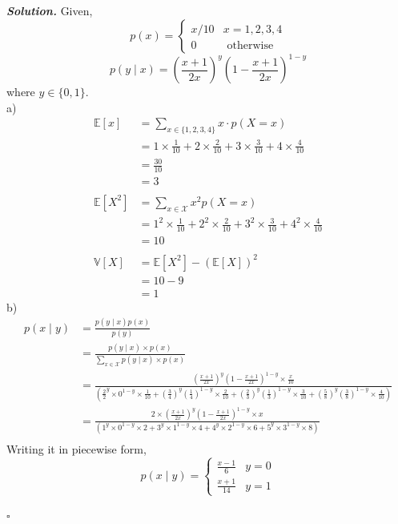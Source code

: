 \documentclass[12pt]{article}
\newenvironment{solution}[1][\it{Solution}]{\textbf{#1. } }{$\square$}
\begin{document}
\begin{solution}
Given,
$$
p(x)=\left\{\begin{array}{ll}
x / 10 & x=1,2,3,4 \\
0 & \text { otherwise }
\end{array}\right.
$$
$$
p(y \mid x)=\left(\frac{x+1}{2 x}\right)^{y}\left(1-\frac{x+1}{2 x}\right)^{1-y}
$$
where $y \in\{0,1\}$.\\
a)
\begin{align*}
\mathbb{E}[x] &=\sum_{x \in\{1,2,3,4\}} x \cdot p(X=x) \\
&=1 \times \frac{1}{10}+2 \times \frac{2}{10}+3 \times \frac{3}{10}+4 \times \frac{4}{10} \\
&=\frac{30}{10}\\
&=\boxed{3}\\\\
\mathbb{E}\left[X^{2}\right] &=\sum_{x \in \mathcal{X}} x^{2} p(X=x) \\
&=1^{2} \times \frac{1}{10}+2^{2} \times \frac{2}{10}+3^{2} \times \frac{3}{10}+4^{2}\times\frac{4}{10}\\
&=10\\\\
\mathbb{V}\left[X\right] &= \mathbb{E}\left[X^{2}\right] - \left(\mathbb{E}\left[X\right]\right)^{2}\\
&= 10 - 9\\
&= \boxed{1}
\end{align*}
b)
\begin{align*}
p(x \mid y)&=\frac{p(y \mid x) p(x)}{p(y)}\\
&=\frac{p(y \mid x) \times p(x)}{\sum_{x \in \mathcal{X}} p(y \mid x) \times p(x)}\\
&=\frac{\left(\frac{x+1}{2 x}\right)^{y}\left(1-\frac{x+1}{2 x}\right)^{1-y} \times \frac{x}{10}}{\left({\frac{2}{2}}^{y} \times 0^{1-y} \times \frac{1}{10}+\left(\frac{3}{4}\right)^{y}\left(\frac{1}{4}\right)^{1-y}\times\frac{2}{10}+\left(\frac{2}{3}\right)^{y}\left(\frac{1}{3}\right)^{1-y}\times\frac{3}{10}+\left(\frac{5}{8}\right)^{y}\left(\frac{3}{8}\right)^{1-y}\times\frac{4}{10}\right)}\\
&=\frac{2 \times \left(\frac{x+1}{2 x}\right)^{y}\left(1-\frac{x+1}{2 x}\right)^{1-y} \times x}{\left(1^{y} \times 0^{1-y} \times 2+3^{y}\times1^{1-y}\times4+4^{y}\times2^{1-y}\times6+5^{y}\times3^{1-y}\times8\right)}\\
\end{align*}
Writing it in piecewise form,
$$
p(x \mid y)=\left\{\begin{array}{ll}
\frac{x-1}{6} & y=0 \\
\frac{x+1}{14} & y=1
\end{array}\right.
$$


\end{solution}
\end{document}
